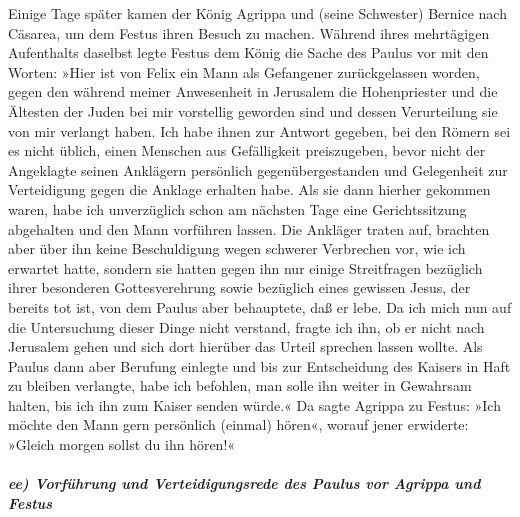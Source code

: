  Einige Tage später kamen der König Agrippa und (seine
Schwester) Bernice nach Cäsarea, um dem Festus ihren Besuch zu machen.
 Während ihres mehrtägigen Aufenthalts daselbst legte
Festus dem König die Sache des Paulus vor mit den Worten: »Hier ist von
Felix ein Mann als Gefangener zurückgelassen worden, 
gegen den während meiner Anwesenheit in Jerusalem die Hohenpriester und
die Ältesten der Juden bei mir vorstellig geworden sind und dessen
Verurteilung sie von mir verlangt haben.  Ich habe ihnen
zur Antwort gegeben, bei den Römern sei es nicht üblich, einen Menschen
aus Gefälligkeit preiszugeben, bevor nicht der Angeklagte seinen
Anklägern persönlich gegenübergestanden und Gelegenheit zur Verteidigung
gegen die Anklage erhalten habe.  Als sie dann hierher
gekommen waren, habe ich unverzüglich schon am nächsten Tage eine
Gerichtssitzung abgehalten und den Mann vorführen lassen.
 Die Ankläger traten auf, brachten aber über ihn keine
Beschuldigung wegen schwerer Verbrechen vor, wie ich erwartet hatte,
 sondern sie hatten gegen ihn nur einige Streitfragen
bezüglich ihrer besonderen Gottesverehrung sowie bezüglich eines
gewissen Jesus, der bereits tot ist, von dem Paulus aber behauptete, daß
er lebe.  Da ich mich nun auf die Untersuchung dieser
Dinge nicht verstand, fragte ich ihn, ob er nicht nach Jerusalem gehen
und sich dort hierüber das Urteil sprechen lassen wollte.
 Als Paulus dann aber Berufung einlegte und bis zur
Entscheidung des Kaisers in Haft zu bleiben verlangte, habe ich
befohlen, man solle ihn weiter in Gewahrsam halten, bis ich ihn zum
Kaiser senden würde.«  Da sagte Agrippa zu Festus: »Ich
möchte den Mann gern persönlich (einmal) hören«, worauf jener erwiderte:
»Gleich morgen sollst du ihn hören!«

\hypertarget{ee-vorfuxfchrung-und-verteidigungsrede-des-paulus-vor-agrippa-und-festus}{%
\subparagraph{ee) Vorführung und Verteidigungsrede des Paulus vor
Agrippa und
Festus}\label{ee-vorfuxfchrung-und-verteidigungsrede-des-paulus-vor-agrippa-und-festus}}

